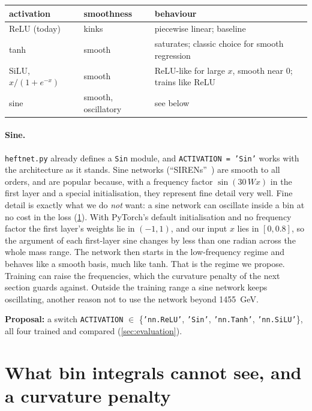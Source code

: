 \documentclass[11pt]{article}
\newcommand{\file}[1]{\nolinkurl{#1}}
\newcommand{\code}[1]{\texttt{#1}}
\begin{document}
\begin{center}
\small
\begin{tabular}{llp{7.6cm}}
\toprule
activation & smoothness & behaviour \\
\midrule
ReLU (today) & kinks & piecewise linear; baseline \\
tanh & smooth & saturates; classic choice for smooth regression \\
SiLU, $x/(1+e^{-x})$ & smooth & ReLU-like for large $x$, smooth near 0; trains like ReLU \\
sine & smooth, oscillatory & see below \\
\bottomrule
\end{tabular}
\end{center}

\paragraph{Sine.} \file{heftnet.py} already defines a \code{Sin} module, and \code{ACTIVATION = 'Sin'}
works with the architecture as it stands. Sine networks (``SIRENs''~\cite{siren}) are smooth to
all orders, and are popular because, with a frequency factor $\sin(30\,Wx)$ in the first layer
and a special initialisation, they represent fine detail very well. Fine detail is exactly what
we do \emph{not} want: a sine network can oscillate inside a bin at no cost in the loss
(\cref{sec:nullspace}). With PyTorch's default initialisation and no frequency factor the first
layer's weights lie in $(-1,1)$, and our input $x$ lies in $[0, 0.8]$, so the argument of each first-layer sine changes
by less than one radian across the whole mass range. The network then starts in the
low-frequency regime and behaves like a smooth basis, much like tanh. That is the regime we
propose. Training can raise the frequencies, which the curvature penalty of the next section
guards against. Outside the training range a sine network keeps oscillating, another reason not
to use the network beyond 1455~GeV.

\textbf{Proposal:} a switch \code{ACTIVATION} $\in$ \{\code{'nn.ReLU'}, \code{'Sin'}, \code{'nn.Tanh'},
\code{'nn.SiLU'}\}, all four trained and compared (\cref{sec:evaluation}).

\section{What bin integrals cannot see, and a curvature penalty}
\label{sec:nullspace}
\end{document}
